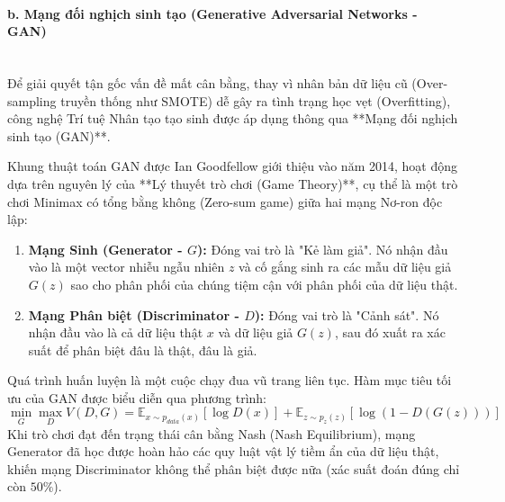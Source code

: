 \paragraph{b. Mạng đối nghịch sinh tạo (Generative Adversarial Networks - GAN)} \mbox{} \\
Để giải quyết tận gốc vấn đề mất cân bằng, thay vì nhân bản dữ liệu cũ (Over-sampling truyền thống như SMOTE) dễ gây ra tình trạng học vẹt (Overfitting), công nghệ Trí tuệ Nhân tạo tạo sinh được áp dụng thông qua **Mạng đối nghịch sinh tạo (GAN)**.

Khung thuật toán GAN được Ian Goodfellow giới thiệu vào năm 2014, hoạt động dựa trên nguyên lý của **Lý thuyết trò chơi (Game Theory)**, cụ thể là một trò chơi Minimax có tổng bằng không (Zero-sum game) giữa hai mạng Nơ-ron độc lập:
\begin{enumerate}
    \item \textbf{Mạng Sinh (Generator - $G$):} Đóng vai trò là "Kẻ làm giả". Nó nhận đầu vào là một vector nhiễu ngẫu nhiên $z$ và cố gắng sinh ra các mẫu dữ liệu giả $G(z)$ sao cho phân phối của chúng tiệm cận với phân phối của dữ liệu thật.
    \item \textbf{Mạng Phân biệt (Discriminator - $D$):} Đóng vai trò là "Cảnh sát". Nó nhận đầu vào là cả dữ liệu thật $x$ và dữ liệu giả $G(z)$, sau đó xuất ra xác suất để phân biệt đâu là thật, đâu là giả.
\end{enumerate}
Quá trình huấn luyện là một cuộc chạy đua vũ trang liên tục. Hàm mục tiêu tối ưu của GAN được biểu diễn qua phương trình:
$$\min_G \max_D V(D, G) = \mathbb{E}_{x \sim p_{data}(x)}[\log D(x)] + \mathbb{E}_{z \sim p_z(z)}[\log(1 - D(G(z)))]$$
Khi trò chơi đạt đến trạng thái cân bằng Nash (Nash Equilibrium), mạng Generator đã học được hoàn hảo các quy luật vật lý tiềm ẩn của dữ liệu thật, khiến mạng Discriminator không thể phân biệt được nữa (xác suất đoán đúng chỉ còn $50\%$).

